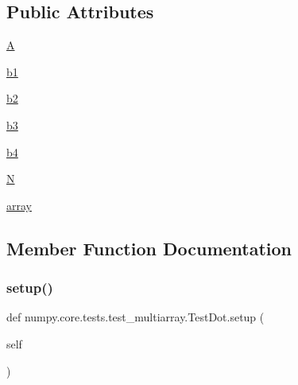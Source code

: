 \subsection*{Public Attributes}
\begin{DoxyCompactItemize}
\item 
\hyperlink{classnumpy_1_1core_1_1tests_1_1test__multiarray_1_1TestDot_af1eb22edbef7f094e97f3d8c8e0e6eca}{A}
\item 
\hyperlink{classnumpy_1_1core_1_1tests_1_1test__multiarray_1_1TestDot_a4d7ea7c12d84a920759be9c640a2a22f}{b1}
\item 
\hyperlink{classnumpy_1_1core_1_1tests_1_1test__multiarray_1_1TestDot_a277e5f97c93d1eeb6c733df85a38e38c}{b2}
\item 
\hyperlink{classnumpy_1_1core_1_1tests_1_1test__multiarray_1_1TestDot_ad0450394570031632d33b6011525fc2c}{b3}
\item 
\hyperlink{classnumpy_1_1core_1_1tests_1_1test__multiarray_1_1TestDot_a261d3ddcd4a44d5d004c60d7a5f194ba}{b4}
\item 
\hyperlink{classnumpy_1_1core_1_1tests_1_1test__multiarray_1_1TestDot_a950e6cc0b0b62f807bc33783644d3ac5}{N}
\item 
\hyperlink{classnumpy_1_1core_1_1tests_1_1test__multiarray_1_1TestDot_a4da6bfff5c64932eb1975e1977c7b542}{array}
\end{DoxyCompactItemize}


\subsection{Member Function Documentation}
\mbox{\label{classnumpy_1_1core_1_1tests_1_1test__multiarray_1_1TestDot_aa0f474d3d3e96eeee9b175a3a1cf21c1}} 
\subsubsection{\texorpdfstring{setup()}{setup()}}
{\footnotesize\ttfamily def numpy.\+core.\+tests.\+test\+\_\+multiarray.\+Test\+Dot.\+setup (\begin{DoxyParamCaption}\item[{}]{self }\end{DoxyParamCaption})}

